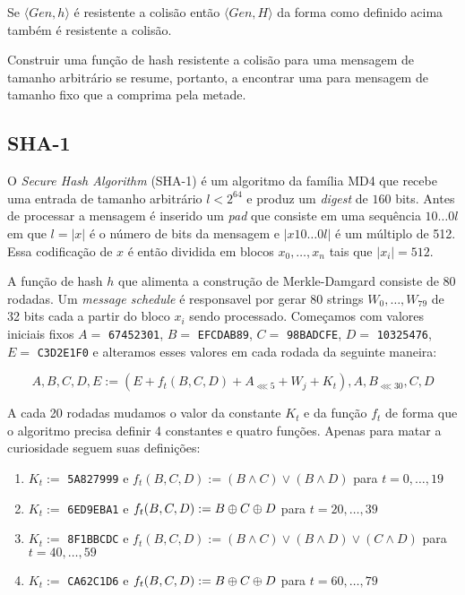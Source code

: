 \begin{theorem}
  Se $\langle Gen, h \rangle$ é resistente a colisão então $\langle Gen, H \rangle$ da forma como definido acima também é resistente a colisão.
\end{theorem}

Construir uma função de hash resistente a colisão para uma mensagem de tamanho arbitrário se resume, portanto, a encontrar uma para mensagem de tamanho fixo que a comprima pela metade.

\subsection{SHA-1}
\label{sec:sha-1}

O {\em Secure Hash Algorithm} (SHA-1) é um algoritmo da família MD4 que recebe uma entrada de tamanho arbitrário $l < 2^{64}$ e produz um {\em digest} de $160$ bits.
Antes de processar a mensagem é inserido um {\em pad} que consiste em uma sequência $10 \dots 0l$ em que $l = |x|$ é o número de bits da mensagem e $|x10 \dots 0l|$ é um múltiplo de 512.
Essa codificação de $x$ é então dividida em blocos $x_0, \dots, x_n$ tais que $|x_i| = 512$.

A função de hash $h$ que alimenta a construção de Merkle-Damgard consiste de 80 rodadas.
Um {\em message schedule} é responsavel por gerar 80 strings $W_0, \dots, W_{79}$ de 32 bits cada a partir do bloco $x_i$ sendo processado. 
Começamos com valores iniciais fixos $A =$ {\tt 67452301}, $B =$ {\tt EFCDAB89}, $C =$ {\tt 98BADCFE}, $D =$ {\tt 10325476}, $E =$ {\tt C3D2E1F0} e alteramos esses valores em cada rodada da seguinte maneira:

\begin{displaymath}
  A, B, C, D, E := (E + f_t(B,C,D) + A_{\lll 5} + W_j + K_t), A, B_{\lll 30}, C, D
\end{displaymath}

A cada 20 rodadas mudamos o valor da constante $K_t$ e da função $f_t$ de forma que o algoritmo precisa definir 4 constantes e quatro funções.
Apenas para matar a curiosidade seguem suas definições:
\begin{enumerate}
\item $K_t :=$ {\tt 5A827999} e $f_t(B,C,D) := (B \land C) \lor (B \land D)$ para $t = 0, \dots, 19$
\item $K_t :=$ {\tt 6ED9EBA1} e $f_t(B,C,D) := B \oplus C \oplus D$ para $t = 20, \dots, 39$ 
\item $K_t :=$ {\tt 8F1BBCDC} e $f_t(B,C,D) := (B \land C) \lor (B \land D) \lor (C \land D)$ para $t = 40, \dots, 59$
\item $K_t :=$ {\tt CA62C1D6} e $f_t(B,C,D) := B \oplus C \oplus D$ para $t = 60, \dots, 79$ 
\end{enumerate}

